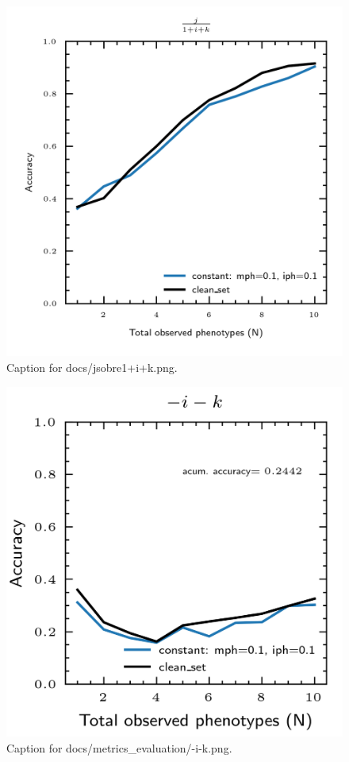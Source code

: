 \documentclass{article}
\begin{document}
\begin{figure}[h] \centering \includegraphics{docs/jsobre1+i+k.png} \caption{Caption for docs/jsobre1+i+k.png.} \end{figure}
\begin{figure}[h] \centering \includegraphics{docs/metrics_evaluation/-i-k.png} \caption{Caption for docs/metrics_evaluation/-i-k.png.} \end{figure}
\end{document}
